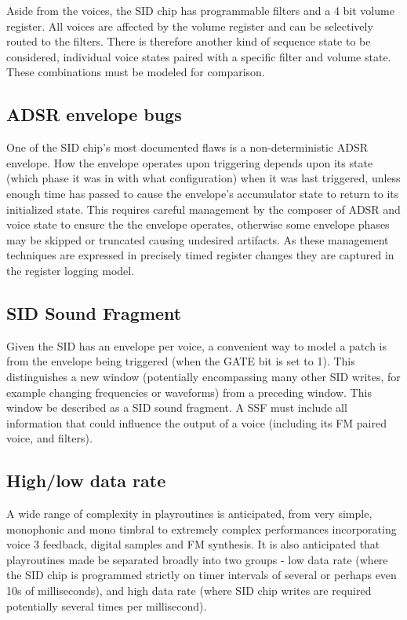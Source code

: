 \documentclass[10pt]{article}
\begin{document}
\begin{multicols*}{2}
  Aside from the voices, the SID chip has programmable filters and a 4
  bit volume register. All voices are affected by the volume register
  and can be selectively routed to the filters. There is therefore
  another kind of sequence state to be considered, individual voice
  states paired with a specific filter and volume state. These
  combinations must be modeled for comparison.

  \subsection{ADSR envelope bugs}
  One of the SID chip's most documented flaws is a non-deterministic
  ADSR envelope. How the envelope operates upon triggering depends
  upon its state (which phase it was in with what configuration) when
  it was last triggered, unless enough time has passed to cause the
  envelope's accumulator state to return to its initialized state.
  This requires careful management by the composer of ADSR and voice
  state to ensure the the envelope operates, otherwise some envelope
  phases may be skipped or truncated causing undesired artifacts. As
  these management techniques are expressed in precisely timed
  register changes they are captured in the register logging model.

  \subsection{SID Sound Fragment}
  Given the SID has an envelope per voice, a convenient way to model
  a patch is from the envelope being triggered (when the GATE bit
  is set to 1). This distinguishes a new window (potentially encompassing
  many other SID writes, for example changing frequencies or
  waveforms) from a preceding window. This window be described
  as a SID sound fragment. A SSF must include all information
  that could influence the output of a voice (including its
  FM paired voice, and filters).

  \subsection{High/low data rate}
  A wide range of complexity in playroutines is anticipated, from
  very simple, monophonic and mono timbral to extremely
  complex performances incorporating voice 3 feedback, digital
  samples and FM synthesis. It is also anticipated that playroutines
  made be separated broadly into two groups - low data rate (where
  the SID chip is programmed strictly on timer intervals of
  several or perhaps even 10s of milliseconds), and high data rate
  (where SID chip writes are required potentially several times
  per millisecond).


\end{multicols*}
\end{document}

